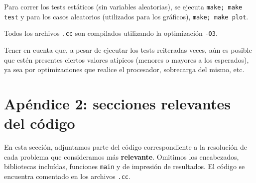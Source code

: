 \documentclass[a4paper]{article}
\begin{document}
Para correr los tests estáticos (sin variables aleatorias), se ejecuta \verb|make; make test| y para los
casos aleatorios (utilizados para los gráficos), \verb|make; make plot|.

Todos los archivos \verb|.cc| son compilados utilizando la optimización \verb|-O3|. \medskip

Tener en cuenta que, a pesar de ejecutar los tests reiteradas veces, aún es posible que estén presentes ciertos
valores atípicos (menores o mayores a los esperados), ya sea por optimizaciones que realice el procesador, sobrecarga
del mismo, etc.
\newpage

\section{Apéndice 2: secciones relevantes del código}
En esta sección, adjuntamos parte del código correspondiente a la resolución de cada problema
que consideramos más \textbf{relevante}. Omitimos los encabezados, bibliotecas incluídas,
funciones \verb|main| y de impresión de resultados. El código se encuentra comentado en los
archivos \verb|.cc|.






\end{document}

